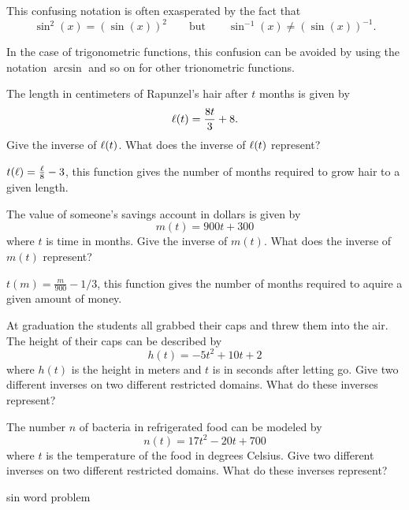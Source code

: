 This confusing notation is often exasperated by the fact that 
\[
\sin^2(x) = (\sin(x))^2\qquad \text{but} \qquad \sin^{-1}(x)
\ne(\sin(x))^{-1}.
\]

In the case of trigonometric functions, this confusion can be avoided
by using the notation $\arcsin$ and so on for other trionometric
functions.




\begin{exercises}

\begin{exercise}
The length in centimeters of Rapunzel's hair after $t$ months is given
by
\[
\ell(t) = \frac{8t}{3}+8.
\]
Give the inverse of $\ell(t)$.  What does the inverse of $\ell(t)$
 represent?
\begin{answer}
$t(\ell) = \frac{\ell}{8} - 3$, this function gives the number of months
  required to grow hair to a given length. 
\end{answer}
\end{exercise}

\begin{exercise}
The value of someone's savings account in dollars is given by
\[
m(t) = 900t + 300
\]
where $t$ is time in months. Give the inverse of $m(t)$.  What does 
the inverse of $m(t)$ represent?
\begin{answer}
$t(m) = \frac{m}{900} - 1/3$, this function gives the number of months
  required to aquire a given amount of money. 
\end{answer}
\end{exercise}

\begin{exercise}
At graduation the students all grabbed their caps and threw them into
the air.  The height of their caps can be described by 
\[
h(t) = -5t^2+10t+2
\]
where $h(t)$ is the height in meters and $t$ is in seconds after
letting go. Give two different inverses on two different restricted
domains. What do these inverses represent?
\end{exercise}

\begin{exercise}
The number $n$ of bacteria in refrigerated food can be modeled by
\[
n(t) =17t^2 - 20t + 700
\]
where $t$ is the temperature of the food in degrees Celsius.  Give two
different inverses on two different restricted domains. What do these
inverses represent?
\end{exercise}


\begin{exercise}
sin word problem
\end{exercise}



\end{exercises}
